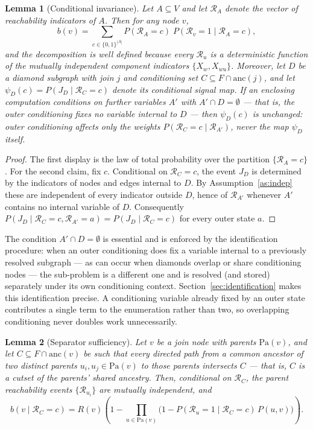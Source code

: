 \documentclass[preprint,12pt]{elsarticle}
\newtheorem{lemma}{Lemma}
\theoremstyle{definition}
\begin{document}
\begin{lemma}[Conditional invariance]\label{lem:invariance}
Let $A\subseteq V$ and let $\mathcal{R}_A$ denote the vector of reachability indicators of $A$. Then for
any node $v$,
\begin{equation}\label{eq:ltp}
b(v)=\sum_{c\in\{0,1\}^{|A|}} P(\mathcal{R}_A=c)\; P(\mathcal{R}_v=1\mid \mathcal{R}_A=c),
\end{equation}
and the decomposition is well defined because every $\mathcal{R}_u$ is a deterministic function of the
mutually independent component indicators $\{X_w, X_{wu}\}$. Moreover, let $D$ be a diamond subgraph with
join $j$ and conditioning set $C\subseteq F\cap\mathrm{anc}(j)$, and let
$\psi_D(c)=P(J_D\mid \mathcal{R}_C=c)$ denote its conditional signal map. If an enclosing computation
conditions on further variables $A'$ with $A'\cap D=\emptyset$ --- that is, the outer conditioning fixes
no variable internal to $D$ --- then $\psi_D(c)$ is unchanged: outer conditioning affects only the
weights $P(\mathcal{R}_C=c\mid \mathcal{R}_{A'})$, never the map $\psi_D$ itself.
\end{lemma}

\begin{proof}
The first display is the law of total probability over the partition $\{\mathcal{R}_A=c\}$. For the
second claim, fix $c$. Conditional on $\mathcal{R}_C=c$, the event $J_D$ is determined by the indicators
of nodes and edges internal to $D$. By Assumption~\ref{as:indep} these are independent of every indicator
outside $D$, hence of $\mathcal{R}_{A'}$ whenever $A'$ contains no internal variable of $D$.
Consequently $P(J_D\mid \mathcal{R}_C=c,\mathcal{R}_{A'}=a)=P(J_D\mid \mathcal{R}_C=c)$ for every outer
state $a$.
\end{proof}

The condition $A'\cap D=\emptyset$ is essential and is enforced by the identification procedure: when an
outer conditioning does fix a variable internal to a previously resolved subgraph --- as can occur when
diamonds overlap or share conditioning nodes --- the sub-problem is a different one and is resolved (and
stored) separately under its own conditioning context. Section~\ref{sec:identification} makes this
identification precise. A conditioning variable already fixed by an outer state contributes a single
term to the enumeration rather than two, so overlapping conditioning never doubles work unnecessarily.

\begin{lemma}[Separator sufficiency]\label{lem:separator}
Let $v$ be a join node with parents $\mathrm{Pa}(v)$, and let $C\subseteq F\cap\mathrm{anc}(v)$ be such
that every directed path from a common ancestor of two distinct parents $u_i,u_j\in\mathrm{Pa}(v)$ to
those parents intersects $C$ --- that is, $C$ is a cutset of the parents' shared ancestry. Then,
conditional on $\mathcal{R}_C$, the parent reachability events $\{\mathcal{R}_{u_i}\}$ are mutually
independent, and
\begin{equation}
b(v\mid \mathcal{R}_C=c)=R(v)\left(1-\prod_{u\in\mathrm{Pa}(v)}
\bigl(1-P(\mathcal{R}_u=1\mid \mathcal{R}_C=c)\,P(u,v)\bigr)\right).
\end{equation}
\end{lemma}
\end{document}
